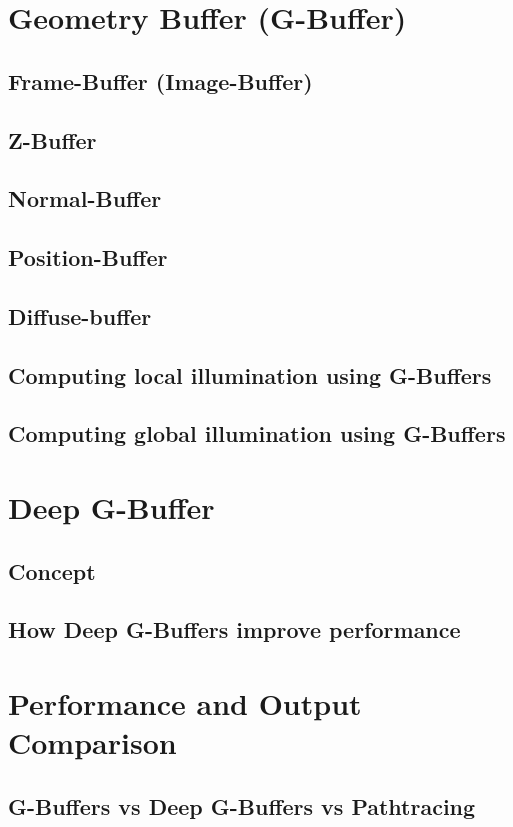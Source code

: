 \documentclass{ACGSeminar}
\begin{document}
\section{Geometry Buffer (G-Buffer)}
	\subsection{Frame-Buffer (Image-Buffer)}
	\subsection{Z-Buffer}
	\subsection{Normal-Buffer}
	\subsection{Position-Buffer}
	\subsection{Diffuse-buffer}
	\subsection{Computing local illumination using G-Buffers}
	\subsection{Computing global illumination using G-Buffers}

\section{Deep G-Buffer}
	\subsection{Concept}
	\subsection{How Deep G-Buffers improve performance}

\section{Performance and Output Comparison}
	\subsection{G-Buffers vs Deep G-Buffers vs Pathtracing}
\end{document}
